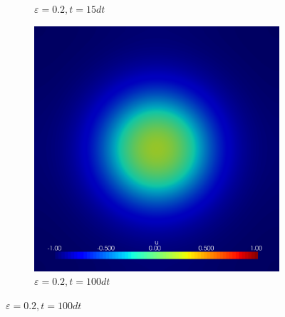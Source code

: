 \begin{figure}[h]
\begin{subfigure}[b]{0.3\linewidth}
		\caption{$ \varepsilon = 0.2, t = 15 dt $}
	\end{subfigure}
	\hfill
	\begin{subfigure}[b]{0.3\linewidth}
		\includegraphics[width=\linewidth]{numerical_simulation/bump/eps_0.2000101.vtu}
		\caption{$ \varepsilon = 0.2, t =  100 dt $}
	\end{subfigure}
	

\end{figure}
